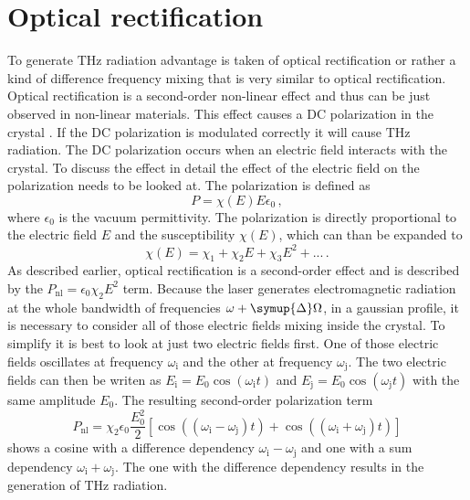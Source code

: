 \section{Optical rectification}\label{sec:optic_ref}
To generate $\si{\tera\hertz}$ radiation advantage is taken of optical rectification or rather a kind of difference frequency mixing that is very similar to optical rectification.
Optical rectification is a second-order non-linear effect and thus can be just observed in non-linear materials.
This effect causes a DC polarization in the crystal \cite{wiki_book}.
If the DC polarization is modulated correctly it will cause $\si{\tera\hertz}$ radiation.
The DC polarization occurs when an electric field interacts with the crystal.
To discuss the effect in detail the effect of the electric field on the polarization needs to be looked at.
The polarization is defined as
\begin{equation}
P = \chi(E) E \epsilon_0\, ,
\end{equation}
where $\epsilon_0$ is the vacuum permittivity.
The polarization is directly proportional to the electric field $E$ and the susceptibility $\chi(E)$, which can than be expanded to 
\begin{equation}
    \chi(E) = \chi_1 + \chi_2 E +\chi_3 E^2 + ...   \, .
\end{equation}
As described earlier, optical rectification is a second-order effect and is described by the $P_\text{nl} = \epsilon_0\chi_2 E^2$ term.
Because the laser generates electromagnetic radiation at the whole bandwidth of frequencies $\omega + \symup{\Delta}\Omega$, in a gaussian profile, it is necessary to consider all of those electric fields mixing inside the crystal.
To simplify it is best to look at just two electric fields first.
One of those electric fields oscillates at frequency $\omega_\text{i}$ and the other at frequency $\omega_\text{j}$.
The two electric fields can then be writen as $E_\text{i} = E_0\cos(\omega_\text{i} t)$ and $E_\text{j} = E_0\cos(\omega_\text{j} t)$ with the same amplitude $E_0$.
The resulting second-order polarization term 
\begin{equation}
    P_\text{nl} = \chi_2 \epsilon_0 \frac{E_0^2}{2}\left[\cos((\omega_\text{i} - \omega_\text{j})t) + \cos((\omega_\text{i} + \omega_\text{j})t)\right]
\label{eq:two_freq_mixing}
\end{equation}
shows a cosine with a difference dependency $\omega_\text{i}-\omega_\text{j}$ and one with a sum dependency $\omega_\text{i}+\omega_\text{j}$.
The one with the difference dependency results in the generation of $\si{\tera\hertz}$ radiation. %
